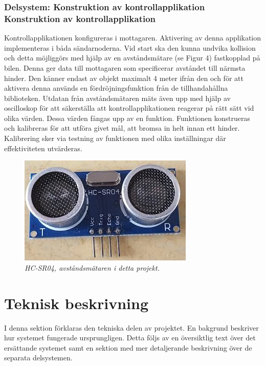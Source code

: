\documentclass[a4paper]{article}
\begin{document}
\subsubsection{Delsystem: Konstruktion av kontrollapplikation \\ Konstruktion av kontrollapplikation}
Kontrollapplikationen konfigureras i mottagaren. Aktivering av denna applikation implementeras i båda sändarnoderna. Vid start ska den kunna undvika kollision och detta möjliggörs med hjälp av en avståndsmätare (se Figur 4) fastkopplad på bilen. Denna ger data till mottagaren som specificerar avståndet till närmsta hinder. Den känner endast av objekt maximalt 4 meter ifrån den och för att aktivera denna används en fördröjningsfunktion från de tillhandahållna biblioteken. Utdatan från avståndsmätaren mäts även upp med hjälp av oscilloskop för att säkerställa att kontrollapplikationen reagerar på rätt sätt vid olika värden. Dessa värden fångas upp av en funktion. Funktionen konstrueras och kalibreras för att utföra givet mål, att bromsa in helt innan ett hinder. Kalibrering sker via testning av funktionen med olika inställningar där effektiviteten utvärderas. 

\begin{figure}[H]
\includegraphics[scale=0.6]{DistanceMeasurementFront.jpg}
\centering
\caption{\it HC-SR04, avståndsmätaren i detta projekt.}
\end{figure} 



\newpage
\section{Teknisk beskrivning}
I denna sektion förklaras den tekniska delen av projektet. En bakgrund beskriver hur systemet fungerade ursprungligen. Detta följs av en översiktlig text över det ersättande systemet samt en sektion med mer detaljerande beskrivning över de separata delsystemen.
\end{document}
